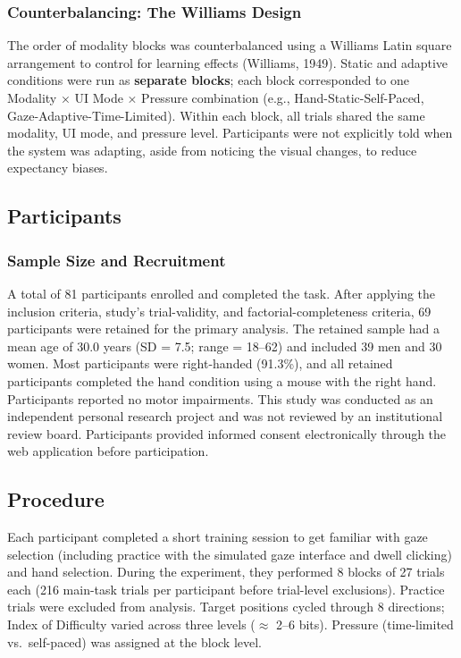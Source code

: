 \documentclass[
  11pt,
  11pt,
  letterpaper]{article}
\begin{document}
\subsubsection{Counterbalancing: The Williams
Design}\label{counterbalancing-the-williams-design}

The order of modality blocks was counterbalanced using a Williams Latin
square arrangement to control for learning effects (Williams, 1949).
Static and adaptive conditions were run as \textbf{separate blocks};
each block corresponded to one Modality × UI Mode × Pressure combination
(e.g., Hand-Static-Self-Paced, Gaze-Adaptive-Time-Limited). Within each
block, all trials shared the same modality, UI mode, and pressure level.
Participants were not explicitly told when the system was adapting,
aside from noticing the visual changes, to reduce expectancy biases.

\subsection{Participants}\label{participants}

\subsubsection{Sample Size and
Recruitment}\label{sample-size-and-recruitment}

A total of 81 participants enrolled and completed the task. After
applying the inclusion criteria, study's trial-validity, and
factorial-completeness criteria, 69 participants were retained for the
primary analysis. The retained sample had a mean age of 30.0 years (SD =
7.5; range = 18--62) and included 39 men and 30 women. Most participants
were right-handed (91.3\%), and all retained participants completed the
hand condition using a mouse with the right hand. Participants reported
no motor impairments. This study was conducted as an independent
personal research project and was not reviewed by an institutional
review board. Participants provided informed consent electronically
through the web application before participation.

\subsection{Procedure}\label{procedure}

Each participant completed a short training session to get familiar with
gaze selection (including practice with the simulated gaze interface and
dwell clicking) and hand selection. During the experiment, they
performed 8 blocks of 27 trials each (216 main-task trials per
participant before trial-level exclusions). Practice trials were
excluded from analysis. Target positions cycled through 8 directions;
Index of Difficulty varied across three levels (\(\approx\) 2--6 bits).
Pressure (time-limited vs.~self-paced) was assigned at the block level.
\end{document}
